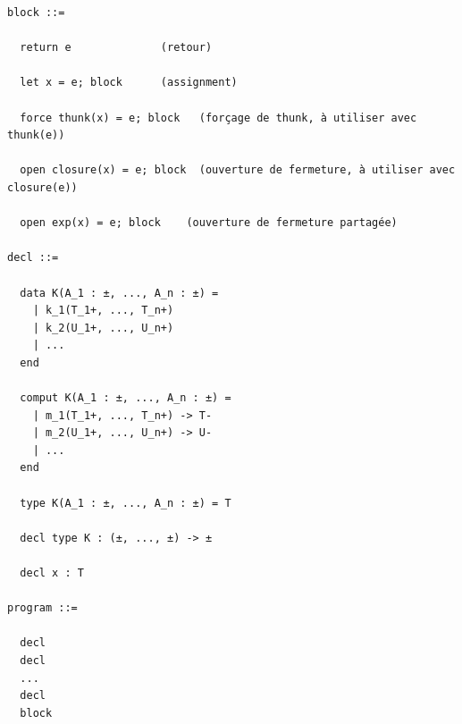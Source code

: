 \documentclass[12pt]{article}
\begin{document}
\begin{verbatim}
block ::= 
  
  return e              (retour)
  
  let x = e; block      (assignment)
  
  force thunk(x) = e; block   (forçage de thunk, à utiliser avec thunk(e)) 
  
  open closure(x) = e; block  (ouverture de fermeture, à utiliser avec closure(e))

  open exp(x) = e; block    (ouverture de fermeture partagée)
  
decl ::=
 
  data K(A_1 : ±, ..., A_n : ±) = 
    | k_1(T_1+, ..., T_n+)
    | k_2(U_1+, ..., U_n+)
    | ...
  end
     
  comput K(A_1 : ±, ..., A_n : ±) = 
    | m_1(T_1+, ..., T_n+) -> T-
    | m_2(U_1+, ..., U_n+) -> U-
    | ... 
  end
   
  type K(A_1 : ±, ..., A_n : ±) = T
     
  decl type K : (±, ..., ±) -> ±

  decl x : T

program ::=

  decl 
  decl
  ...
  decl
  block 
\end{verbatim}
\end{document}
